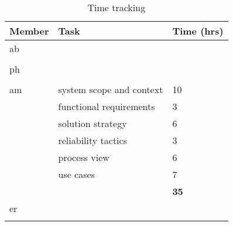 
\begin{table}[H]
	\centering
	\begin{tabularx}{\textwidth}{p{2cm}|X|p{2.5cm}}
		\textbf{Member} & \textbf{Task} & \textbf{Time (hrs)} \\
		\hline
		ab &  &  \\
		& & \textbf{} \\
		\hline
		ph &  &  \\
		& & \textbf{} \\
		\hline
		am & system scope and context & 10 \\
		 & functional requirements & 3 \\
		 & solution strategy & 6 \\
		 & reliability tactics & 3 \\
		 & process view & 6 \\
		 & use cases & 7 \\
		& & \textbf{35} \\
		\hline
		er &  &  \\
		& & \textbf{} \\
		\hline
	\end{tabularx}
	\caption{Time tracking}
	\label{tab:timetracking-1}
\end{table}
